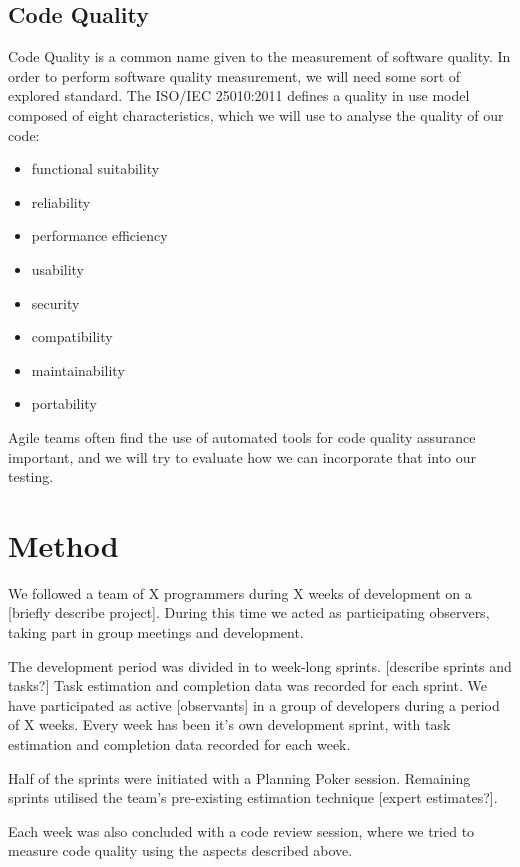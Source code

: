 \documentclass{sigchi}
\begin{document}
\subsection{Code Quality}
Code Quality is a common name given to the measurement of software quality.
In order to perform software quality measurement, we will need some sort of explored standard.
The ISO/IEC 25010:2011 defines a quality in use model composed of eight characteristics\cite{iso250102011},
which we will use to analyse the quality of our code:
\begin{itemize}
\setlength{\itemsep}{0.25em}
\item functional suitability
\item reliability
\item performance efficiency
\item usability
\item security
\item compatibility
\item maintainability
\item portability
\end{itemize}

Agile teams often find the use of automated tools for code quality assurance important\cite{Williams:2012:ATT:2133806.2133823}, and we will try to evaluate how we can incorporate that into our testing\cite{ala2005survey}.

\section{Method}

We followed a team of X programmers during X weeks of development on a [briefly describe project]. During this time we acted as participating observers, taking part in group meetings and development.

The development period was divided in to week-long sprints. [describe sprints and tasks?] Task estimation and completion data was recorded for each sprint.
We have participated as active [observants] in a group of developers during a period of X weeks. Every week has been it's own development sprint, with task estimation and completion data recorded for each week.


Half of the sprints were initiated with a Planning Poker session. Remaining sprints utilised the team's pre-existing estimation technique [expert estimates?].

Each week was also concluded with a code review session, where we tried to measure code quality using the aspects described above.
\end{document}
